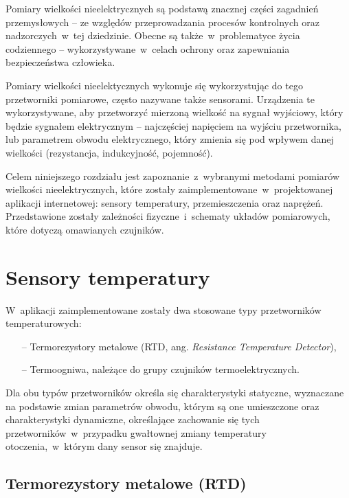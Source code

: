 Pomiary wielkości nieelektrycznych są podstawą znacznej części zagadnień przemysłowych -- ze
względów przeprowadzania procesów kontrolnych oraz nadzorczych~w~tej dziedzinie. Obecne są
także~w~problematyce życia codziennego -- wykorzystywane~w~celach ochrony oraz zapewniania
bezpieczeństwa człowieka.

Pomiary wielkości nieelektycznych wykonuje się wykorzystując do tego przetworniki pomiarowe, często
nazywane także sensorami. Urządzenia te wykorzystywane, aby przetworzyć mierzoną wielkość na sygnał
wyjściowy, który będzie sygnałem elektrycznym -- najczęściej napięciem na wyjściu przetwornika,
lub parametrem obwodu elektrycznego, który zmienia się pod wpływem danej wielkości (rezystancja,
indukcyjność, pojemność).

Celem niniejszego rozdziału jest zapoznanie~z~wybranymi metodami pomiarów wielkości
nieelektrycznych, które zostały zaimplementowane~w~projektowanej aplikacji internetowej: sensory
temperatury, przemieszczenia oraz naprężeń. Przedstawione zostały zależności fizyczne~i~schematy
układów pomiarowych, które dotyczą omawianych czujników.

\section{Sensory temperatury}\label{sect:theory-temperature}
W~aplikacji zaimplementowane zostały dwa stosowane typy przetworników temperaturowych:
\begin{itemize}
  \item [--] Termorezystory metalowe (RTD, ang. \textit{Resistance Temperature Detector}),
  \item [--] Termoogniwa, należące do grupy czujników termoelektrycznych.
\end{itemize}
Dla obu typów przetworników określa się charakterystyki statyczne, wyznaczane na podstawie zmian
parametrów obwodu, którym są one umieszczone oraz charakterystyki dynamiczne, określające zachowanie
się tych przetworników~w~przypadku gwałtownej zmiany temperatury otoczenia,~w~którym dany sensor się
znajduje.

\subsection{Termorezystory metalowe (RTD)}


\FloatBarrier
